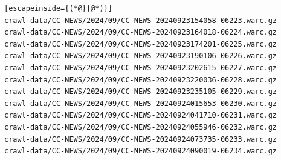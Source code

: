 \begin{lstlisting}[escapeinside={(*@}{@*)}]
crawl-data/CC-NEWS/2024/09/CC-NEWS-20240923154058-06223.warc.gz
crawl-data/CC-NEWS/2024/09/CC-NEWS-20240923164018-06224.warc.gz
crawl-data/CC-NEWS/2024/09/CC-NEWS-20240923174201-06225.warc.gz
crawl-data/CC-NEWS/2024/09/CC-NEWS-20240923190106-06226.warc.gz
crawl-data/CC-NEWS/2024/09/CC-NEWS-20240923202615-06227.warc.gz
crawl-data/CC-NEWS/2024/09/CC-NEWS-20240923220036-06228.warc.gz
crawl-data/CC-NEWS/2024/09/CC-NEWS-20240923235105-06229.warc.gz
crawl-data/CC-NEWS/2024/09/CC-NEWS-20240924015653-06230.warc.gz
crawl-data/CC-NEWS/2024/09/CC-NEWS-20240924041710-06231.warc.gz
crawl-data/CC-NEWS/2024/09/CC-NEWS-20240924055946-06232.warc.gz
crawl-data/CC-NEWS/2024/09/CC-NEWS-20240924073735-06233.warc.gz
crawl-data/CC-NEWS/2024/09/CC-NEWS-20240924090019-06234.warc.gz
\end{lstlisting}

